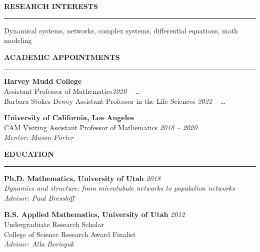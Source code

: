 \documentclass{resume} %
\renewenvironment{rSection}[1]{
\sectionskip
\textcolor{WinePurple}{\MakeUppercase{#1}}
\sectionlineskip
\hrule
\begin{list}{}{
\setlength{\leftmargin}{1.5em}
}
\item[]
}{
\end{list}
}
\begin{document}
\begin{rSection}{\bf Research Interests}
Dynamical systems, networks, complex systems, differential equations, math modeling 
\end{rSection}


\begin{rSection}{\bf Academic Appointments}
{\bf Harvey Mudd College} \hfill \\ 
Assistant Professor of Mathematics\hfill {\em 2020 -- \dots} \\ 
Barbara Stokes Dewey Assistant Professor in the Life Sciences \hfill {\em 2022 -- \dots} 

{\bf University of California, Los Angeles} \hfill \\ 
CAM Visiting Assistant Professor of Mathematics \hfill {\em 2018 -- 2020}  \\
{\em Mentor: Mason Porter}
\end{rSection}


\begin{rSection}{\bf Education}
{\bf Ph.D. Mathematics, University of Utah} \hfill {\em 2018} \\
{\em Dynamics and structure: from microtubule networks to population networks} \\
{\em Advisor: Paul Bressloﬀ} 

{\bf B.S. Applied Mathematics, University of Utah} \hfill {\em 2012} \\
Undergraduate Research Scholar \\
College of Science Research Award Finalist \\
{\em Advisor: Alla Borisyuk} 
\end{rSection}

\end{document}
